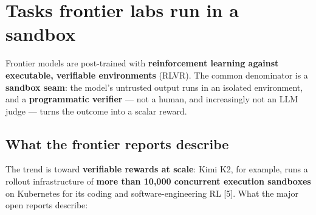 \documentclass[
  paper=a4,
  ,captions=tableheading
]{scrartcl}
\begin{document}
\hypertarget{tasks-frontier-labs-run-in-a-sandbox}{%
\section{Tasks frontier labs run in a
sandbox}\label{tasks-frontier-labs-run-in-a-sandbox}}

Frontier models are post-trained with \textbf{reinforcement learning
against executable, verifiable environments} (RLVR). The common
denominator is a \textbf{sandbox seam}: the model's untrusted output
runs in an isolated environment, and a \textbf{programmatic verifier}
--- not a human, and increasingly not an LLM judge --- turns the outcome
into a scalar reward.

\hypertarget{what-the-frontier-reports-describe}{%
\subsection{What the frontier reports
describe}\label{what-the-frontier-reports-describe}}

The trend is toward \textbf{verifiable rewards at scale}: Kimi K2, for
example, runs a rollout infrastructure of \textbf{more than 10,000
concurrent execution sandboxes} on Kubernetes for its coding and
software-engineering RL {[}5{]}. What the major open reports describe:
\end{document}
